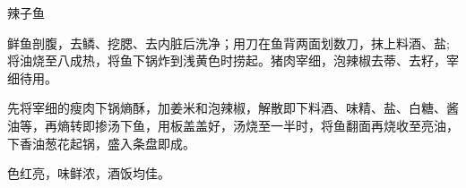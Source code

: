 \begin{recipe}{辣子鱼}

\ingredients



\cooking

\step 鲜鱼剖腹，去鳞、挖腮、去内脏后洗净；用刀在鱼背两面划数刀，抹上料酒、盐;将油烧至八成热，将鱼下锅炸到浅黄色时捞起。猪肉宰细，泡辣椒去蒂、去籽，宰细待用。

\step 先将宰细的瘦肉下锅熵酥，加姜米和泡辣椒，解散即下料酒、味精、盐、白糖、酱油等，再熵转即掺汤下鱼，用板盖盖好，汤烧至一半时，将鱼翻面再烧收至亮油，下香油葱花起锅，盛入条盘即成。

\notes

色红亮，味鲜浓，酒饭均佳。

\end{recipe}

